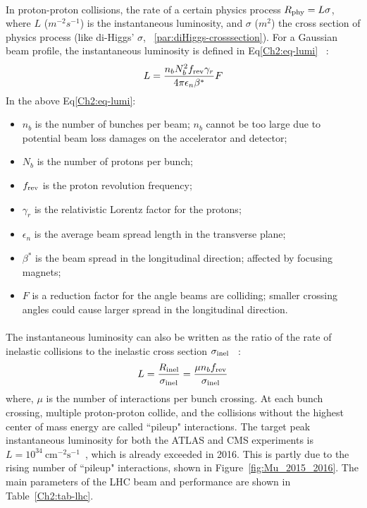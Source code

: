 \paragraph{} 
In proton-proton collisions, the rate of a certain physics process $R_{\rm phy} = L\sigma$, where $L$ ($m^{-2}s^{-1}$) is the instantaneous luminosity, and $\sigma$ ($m^2$) the cross section of physics process (like di-Higgs' $\sigma$, ~\ref{par:diHiggs-crosssection}). For a Gaussian beam profile, the instantaneous luminosity is defined in Eq\ref{Ch2:eq-lumi} ~\cite{LHCReview}:
%
\begin{equation}
\label{Ch2:eq-lumi}
L = \frac{n_b N_b^2 f_{\rm rev} \gamma_r}{4\pi \epsilon_n \beta^*} F
\end{equation}
%
In the above Eq\ref{Ch2:eq-lumi}:
\begin{itemize}
	\item $n_b$ is the number of bunches per beam; $n_b$ cannot be too large due to potential beam loss damages on the accelerator and detector; %
	\item $N_b$ is the number of protons per bunch;  
	\item $f_{\rm rev}$ is the proton revolution frequency;
	\item $\gamma_r$ is the relativistic Lorentz factor for the protons;
	\item $\epsilon_n$ is the average beam spread length in the transverse plane;
	\item $\beta^*$ is the beam spread in the longitudinal direction; affected by focusing magnets;
	\item $F$ is a reduction factor for the angle beams are colliding; smaller crossing angles could cause larger spread in the longitudinal direction.
\end{itemize}

\paragraph{}
The instantaneous luminosity can also be written as the ratio of the rate of inelastic collisions to the inelastic cross section $\sigma_{\rm inel}$ ~\cite{lumi-paper}:
\begin{equation}
\label{Ch2:eq-lumi2}
L = \frac{R_{\rm inel}}{\sigma_{\rm inel}} = \frac{\mu n_b f_{\rm rev}}{\sigma_{\rm inel}}
\end{equation}
where, $\mu$ is the number of interactions per bunch crossing. At each bunch crossing, multiple proton-proton collide, and the collisions without the highest center of mass energy are called ``pileup" interactions.
The target peak instantaneous luminosity for both the ATLAS and CMS experiments is $L=10^{34}~\text{cm}^{-2}\text{s}^{-1}$~\cite{LHCPaper}, which is already exceeded in 2016. This is partly due to the rising number of ``pileup" interactions, shown in Figure~\ref{fig:Mu_2015_2016}. The main parameters of the LHC beam and performance are shown in Table~\ref{Ch2:tab-lhc}. 

